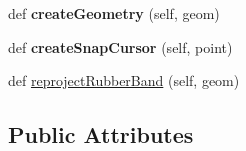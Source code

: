 \begin{DoxyCompactItemize}
def {\bfseries create\+Geometry} (self, geom)
\item 
\mbox{\label{class_dsg_tools_1_1_production_tools_1_1_acquisition_1_1geometrica_aquisition_1_1_geometrica_acquisition_a87ee468a059cd174556153895fcd3091}} 
def {\bfseries create\+Snap\+Cursor} (self, point)
\item 
def \mbox{\hyperlink{class_dsg_tools_1_1_production_tools_1_1_acquisition_1_1geometrica_aquisition_1_1_geometrica_acquisition_a364669314bbb8f6b07d9c77189efd4ec}{reproject\+Rubber\+Band}} (self, geom)
\end{DoxyCompactItemize}
\subsection*{Public Attributes}
